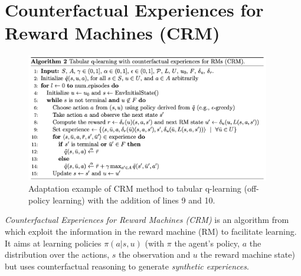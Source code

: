 \documentclass{article}
\begin{document}

\section{Counterfactual Experiences for Reward Machines (CRM)}\label{sec:CRM}%

\begin{figure}[ht]
    \centering
    \includegraphics[width=0.95\textwidth]{images/CRM_alg2.png}
    \caption{Adaptation example of CRM method to tabular q-learning (off-policy learning) with the addition of lines 9 and 10.}
    \label{fig:crm_alg}
\end{figure}

\textit{Counterfactual Experiences for Reward Machines (CRM)} is an algorithm from \cite{icarte2020reward} which exploit the information in the reward machine (RM) to facilitate learning. It aims at learning policies $\pi(a|s,u)$ (with $\pi$ the agent's policy, $a$ the distribution over the actions, $s$ the observation and $u$ the reward machine state) but uses counterfactual reasoning to generate \textit{synthetic experiences}.
\end{document}
